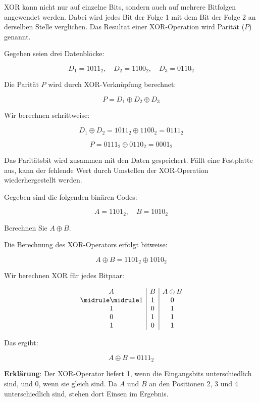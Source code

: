 XOR kann nicht nur auf einzelne Bits, sondern auch auf mehrere Bitfolgen angewendet werden. Dabei wird jedes Bit der Folge 1 mit dem Bit der Folge 2 an derselben Stelle verglichen. Das Resultat einer XOR-Operation wird Parität ($P$) genannt.


\begin{myexample}
Gegeben seien drei Datenblöcke:

\[
    D_1 = 1011_2, \quad D_2 = 1100_2, \quad D_3 = 0110_2
\]

Die Parität \( P \) wird durch XOR-Verknüpfung berechnet:

\[
    P = D_1 \oplus D_2 \oplus D_3
\]

Wir berechnen schrittweise:

\[
    D_1 \oplus D_2 = 1011_2 \oplus 1100_2 = 0111_2
\]

\[
    P = 0111_2 \oplus 0110_2 = 0001_2
\]

Das Paritätsbit wird zusammen mit den Daten gespeichert. Fällt eine Festplatte aus, kann der fehlende Wert durch Umstellen der XOR-Operation wiederhergestellt werden.
\end{myexample}


\begin{myexercise}
    Gegeben sind die folgenden binären Codes:

    \[
        A = 1101_2, \quad B = 1010_2
    \]

    Berechnen Sie \( A \oplus B \).

    \begin{myanswer}
        Die Berechnung des XOR-Operators erfolgt bitweise:

        \[
            A \oplus B = 1101_2 \oplus 1010_2
        \]

        Wir berechnen XOR für jedes Bitpaar:

        \[
            \begin{array}{c|c|c}
                A & B & A \oplus B \\\midrule\midrule
                1 & 1 & 0          \\
                1 & 0 & 1          \\
                0 & 1 & 1          \\
                1 & 0 & 1          \\
            \end{array}
        \]

        Das ergibt:

        \[
            A \oplus B = 0111_2
        \]

        \textbf{Erklärung}:
        Der XOR-Operator liefert 1, wenn die Eingangsbits unterschiedlich sind, und 0, wenn sie gleich sind. Da \( A \) und \( B \) an den Positionen 2, 3 und 4 unterschiedlich sind, stehen dort Einsen im Ergebnis.

    \end{myanswer}
\end{myexercise}


